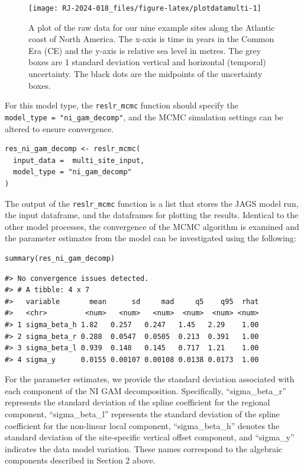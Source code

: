 \begin{figure}
{\centering \texttt{[image: RJ-2024-018\_files/figure-latex/plotdatamulti-1]} 
}
\caption{A plot of the raw data for our nine example sites along the Atlantic coast of North America. The x-axis is time in years in the Common Era (CE) and the y-axis is relative sea level in metres. The grey boxes are 1 standard deviation vertical and horizontal (temporal) uncertainty. The black dots are the midpoints of the uncertainty boxes.}\label{fig:plotdatamulti}
\end{figure}
\normalsize
For this model type, the \texttt{reslr\_mcmc} function should specify the \texttt{model\_type\ =\ "ni\_gam\_decomp"}, and the MCMC simulation settings can be altered to ensure convergence.
\scriptsize
\begin{verbatim}
res_ni_gam_decomp <- reslr_mcmc(
  input_data =  multi_site_input,
  model_type = "ni_gam_decomp"
)
\end{verbatim}
\normalsize
The output of the \texttt{reslr\_mcmc} function is a list that stores the JAGS model run, the input dataframe, and the dataframes for plotting the results. Identical to the other model processes, the convergence of the MCMC algorithm is examined and the parameter estimates from the model can be investigated using the following:
\scriptsize
\begin{verbatim}
summary(res_ni_gam_decomp)
\end{verbatim}
\begin{verbatim}
#> No convergence issues detected.
#> # A tibble: 4 x 7
#>   variable       mean      sd     mad     q5    q95  rhat
#>   <chr>         <num>   <num>   <num>  <num>  <num> <num>
#> 1 sigma_beta_h 1.82   0.257   0.247   1.45   2.29    1.00
#> 2 sigma_beta_r 0.288  0.0547  0.0505  0.213  0.391   1.00
#> 3 sigma_beta_l 0.939  0.148   0.145   0.717  1.21    1.00
#> 4 sigma_y      0.0155 0.00107 0.00108 0.0138 0.0173  1.00
\end{verbatim}
\normalsize
For the parameter estimates, we provide the standard deviation associated with each component of the NI GAM decomposition. Specifically, ``sigma\_beta\_r'' represents the standard deviation of the spline coefficient for the regional component, ``sigma\_beta\_l'' represents the standard deviation of the spline coefficient for the non-linear local component, ``sigma\_beta\_h'' denotes the standard deviation of the site-specific vertical offset component, and ``sigma\_y'' indicates the data model variation. These names correspond to the algebraic components described in Section 2 above.
